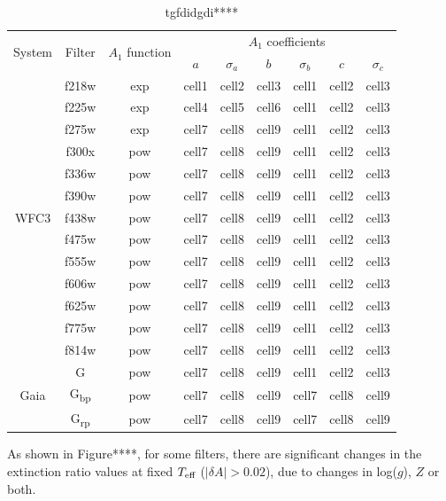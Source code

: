 \documentclass[usenatbib]{mnras}
\begin{document}
\begin{table}
\begin{tabular}{ccccccccc}
\hline
\multirow{2}{*}{System} & \multirow{2}{*}{Filter} & \multirow{2}{*}{$A_{1}$ function} & \multicolumn{6}{c}{$A_{1}$ coefficients} \\ \cline{4-9} %
& & & $a$ & $\sigma_{a}$ & $b$ & $\sigma_{b}$ & $c$ & $\sigma_{c}$ \\ \hline
& f218w & exp & cell1 & cell2 & cell3 & cell1 & cell2 & cell3 \\
& f225w & exp & cell4 & cell5 & cell6 & cell1 & cell2 & cell3 \\
& f275w & exp & cell7 & cell8 & cell9 & cell1 & cell2 & cell3 \\
& f300x & pow & cell7 & cell8 & cell9 & cell1 & cell2 & cell3 \\
& f336w & pow & cell7 & cell8 & cell9 & cell1 & cell2 & cell3 \\
& f390w & pow & cell7 & cell8 & cell9 & cell1 & cell2 & cell3 \\
WFC3 & f438w & pow & cell7 & cell8 & cell9 & cell1 & cell2 & cell3 \\
& f475w & pow & cell7 & cell8 & cell9 & cell1 & cell2 & cell3 \\
& f555w & pow & cell7 & cell8 & cell9 & cell1 & cell2 & cell3 \\
& f606w & pow & cell7 & cell8 & cell9 & cell1 & cell2 & cell3 \\
& f625w & pow & cell7 & cell8 & cell9 & cell1 & cell2 & cell3 \\
& f775w & pow & cell7 & cell8 & cell9 & cell1 & cell2 & cell3 \\
& f814w & pow & cell7 & cell8 & cell9 & cell1 & cell2 & cell3 \\ \hline
& G & pow & cell7 & cell8 & cell9 & cell1 & cell2 & cell3 \\
Gaia & G\textsubscript{bp} & pow & cell7 & cell8 & cell9 & cell7 & cell8 & cell9 \\
& G\textsubscript{rp} & pow & cell7 & cell8 & cell9 & cell7 & cell8 & cell9 \\

\end{tabular}
\caption{tgfdidgdi****}
\label{R1_coeffs_table}
\end{table}

As shown in Figure****, for some filters, there are significant changes in the extinction ratio values at fixed $T_{\textnormal{eff}}$ ($|\delta A| > 0.02$), due to changes in log($g$), $Z$ or both.
\end{document}
